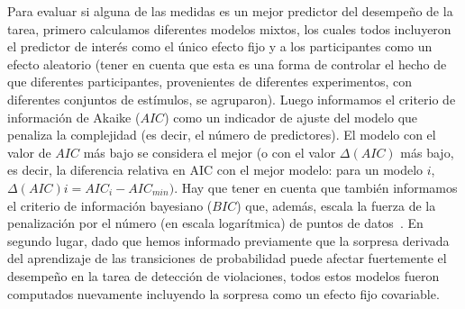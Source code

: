 
Para evaluar si alguna de las medidas es un mejor predictor del desempeño de la tarea, primero calculamos diferentes modelos mixtos, los cuales todos incluyeron el predictor de interés como el único efecto fijo y a los participantes como un efecto aleatorio (tener en cuenta que esta es una forma de controlar el hecho de que diferentes participantes, provenientes de diferentes experimentos, con diferentes conjuntos de estímulos, se agruparon). Luego informamos el criterio de información de Akaike ($AIC$) como un indicador de ajuste del modelo que penaliza la complejidad (es decir, el número de predictores). El modelo con el valor de $AIC$ más bajo se considera el mejor (o con el valor $\Delta(AIC)$ más bajo, es decir, la diferencia relativa en AIC con el mejor modelo: para un modelo $i$, $\Delta (AIC) i = AIC_i - AIC_{min})$. Hay que tener en cuenta que también informamos el criterio de información bayesiano ($BIC$) que, además, escala la fuerza de la penalización por el número (en escala logarítmica) de puntos de datos~\cite{f105}. En segundo lugar, dado que hemos informado previamente que la sorpresa derivada del aprendizaje de las transiciones de probabilidad puede afectar fuertemente el desempeño en la tarea de detección de violaciones, todos estos modelos fueron computados nuevamente incluyendo la sorpresa como un efecto fijo covariable.

